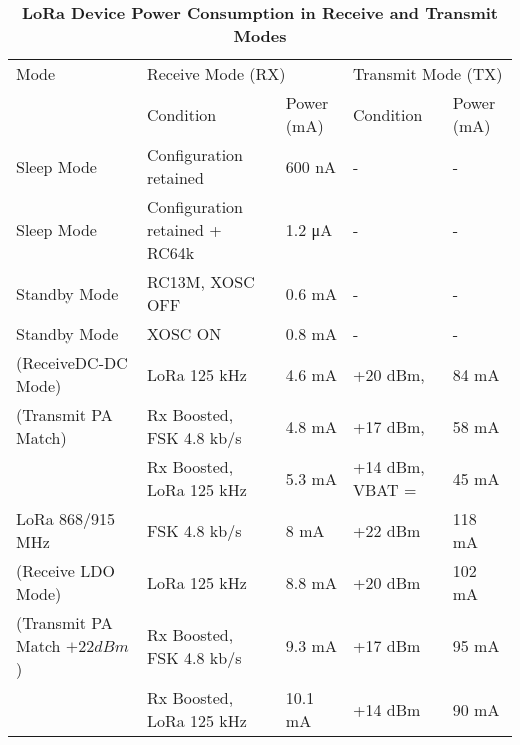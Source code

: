 \begin{table*}[ht!]
    \centering
    \small
    \begin{tabularx}{\textwidth}{l|X|X|X|X}
    \toprule
    Mode & \multicolumn{2}{X|}{Receive Mode (RX)} & \multicolumn{2}{X}{Transmit Mode (TX)} \\
    \cmidrule(lr){2-3} \cmidrule(lr){4-5}
     & Condition & Power (mA) & Condition & Power (mA) \\
    \midrule
    Sleep Mode & Configuration retained & 600 nA & - & - \\
    Sleep Mode & Configuration retained + RC64k & 1.2 μA & - & - \\
    Standby Mode & RC13M, XOSC OFF & 0.6 mA & - & - \\
    Standby Mode & XOSC ON & 0.8 mA & - & - \\
    \midrule
    (ReceiveDC-DC Mode) & LoRa 125 kHz & 4.6 mA & +20 dBm,  & 84 mA \\
    (Transmit PA Match)& Rx Boosted, FSK 4.8 kb/s & 4.8 mA & +17 dBm,  & 58 mA \\
    & Rx Boosted, LoRa 125 kHz & 5.3 mA & +14 dBm, VBAT =  & 45 mA \\
    \midrule
    LoRa 868/915 MHz & FSK 4.8 kb/s & 8 mA & +22 dBm & 118 mA \\
    (Receive LDO Mode) & LoRa 125 kHz & 8.8 mA & +20 dBm & 102 mA \\
    (Transmit PA Match $+22 dBm$) & Rx Boosted, FSK 4.8 kb/s & 9.3 mA & +17 dBm & 95 mA \\
    & Rx Boosted, LoRa 125 kHz & 10.1 mA & +14 dBm & 90 mA \\
    \midrule
    \bottomrule
    \end{tabularx}
    \caption{\textbf{LoRa Device Power Consumption in Receive and Transmit Modes}}
    \label{tab:lora_power}
\end{table*}